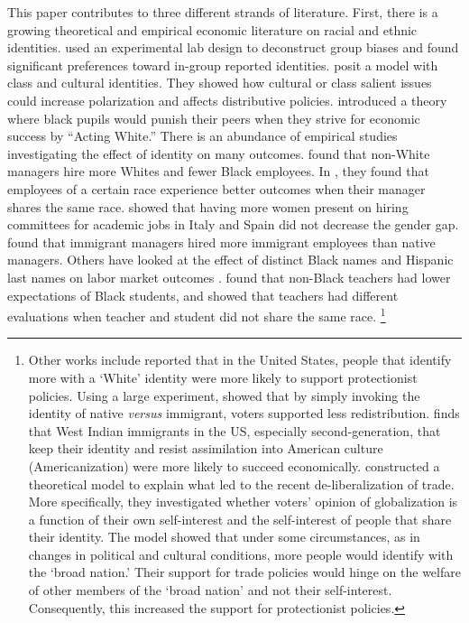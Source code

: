 \documentclass[12pt, fullpage]{article}
\begin{document}
This paper contributes to three different strands of literature. First, there is a growing theoretical and empirical economic literature on racial and ethnic identities. \citet{krantonDeconstructingBiasSocial2020} used an experimental lab design to deconstruct group biases and found significant preferences toward in-group reported identities. \citet{bonomiIdentityBeliefsPolitical2021} posit a model with class and cultural identities. They showed how cultural or class salient issues could increase polarization and affects distributive policies. \citet{fryerEmpiricalAnalysisActing2010a} introduced a theory where black pupils would punish their peers when they strive for economic success by ``Acting White.'' There is an abundance of empirical studies investigating the effect of identity on many outcomes. \citet{giulianoManagerRaceRace2009} found that non-White managers hire more Whites and fewer Black employees. In \citet{giulianoRacialBiasManagerEmployee2011}, they found that employees of a certain race experience better outcomes when their manager shares the same race. \citet{baguesDoesGenderComposition2017} showed that having more women present on hiring committees for academic jobs in Italy and Spain did not decrease the gender gap. \cite{aslundSeekingSimilarityHow2014} found that immigrant managers hired more immigrant employees than native managers. Others have looked at the effect of distinct Black names and Hispanic last names on labor market outcomes \citep{bertrandAreEmilyGreg2004,fryerCausesConsequencesDistinctively2004a,hadahImpactHispanicLast2020}. \citet{gershensonWhoBelievesMe2016} found that non-Black teachers had lower expectations of Black students, and \citet{deeTeacherMeDoes2005} showed that teachers had different evaluations when teacher and student did not share the same race. \footnote{Other works include \citet{jardinaWhiteIdentityPolitics2019} reported that in the United States, people that identify more with a `White' identity were more likely to support protectionist policies. Using a large experiment, \citet{alesinaImmigrationRedistribution2018} showed that by simply invoking the identity of native \emph{versus} immigrant, voters supported less redistribution. \citet{watersBlackIdentitiesWest2001} finds that West Indian immigrants in the US, especially second-generation, that keep their identity and resist assimilation into American culture (Americanization) were more likely to succeed economically. \citet{grossmanIdentityPoliticsTrade2021} constructed a theoretical model to explain what led to the recent de-liberalization of trade. More specifically, they investigated whether voters' opinion of globalization is a function of their own self-interest and the self-interest of people that share their identity. The model showed that under some circumstances, as in changes in political and cultural conditions, more people would identify with the `broad nation.' Their support for trade policies would hinge on the welfare of other members of the `broad nation' and not their self-interest. Consequently, this increased the support for protectionist policies.}
\end{document}
